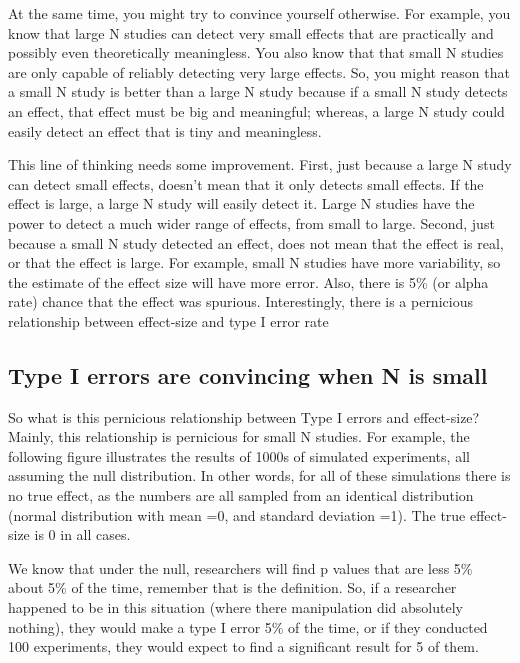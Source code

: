 \documentclass[]{book}
\begin{document}
At the same time, you might try to convince yourself otherwise. For example, you know that large N studies can detect very small effects that are practically and possibly even theoretically meaningless. You also know that that small N studies are only capable of reliably detecting very large effects. So, you might reason that a small N study is better than a large N study because if a small N study detects an effect, that effect must be big and meaningful; whereas, a large N study could easily detect an effect that is tiny and meaningless.

This line of thinking needs some improvement. First, just because a large N study can detect small effects, doesn't mean that it only detects small effects. If the effect is large, a large N study will easily detect it. Large N studies have the power to detect a much wider range of effects, from small to large. Second, just because a small N study detected an effect, does not mean that the effect is real, or that the effect is large. For example, small N studies have more variability, so the estimate of the effect size will have more error. Also, there is 5\% (or alpha rate) chance that the effect was spurious. Interestingly, there is a pernicious relationship between effect-size and type I error rate

\hypertarget{type-i-errors-are-convincing-when-n-is-small}{%
\subsection{Type I errors are convincing when N is small}\label{type-i-errors-are-convincing-when-n-is-small}}

So what is this pernicious relationship between Type I errors and effect-size? Mainly, this relationship is pernicious for small N studies. For example, the following figure illustrates the results of 1000s of simulated experiments, all assuming the null distribution. In other words, for all of these simulations there is no true effect, as the numbers are all sampled from an identical distribution (normal distribution with mean =0, and standard deviation =1). The true effect-size is 0 in all cases.

We know that under the null, researchers will find p values that are less 5\% about 5\% of the time, remember that is the definition. So, if a researcher happened to be in this situation (where there manipulation did absolutely nothing), they would make a type I error 5\% of the time, or if they conducted 100 experiments, they would expect to find a significant result for 5 of them.
\end{document}
